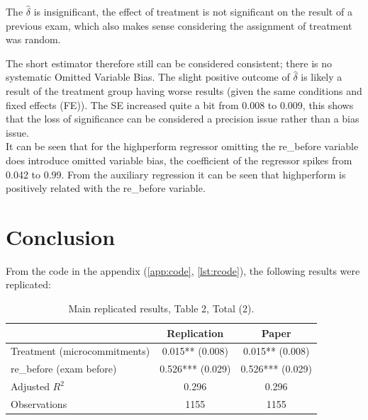 \documentclass[12pt]{article}
\begin{document}
The $\hat{\delta}$ is insignificant, the effect of treatment is not significant on the result of a previous exam, which also makes sense considering the assignment of treatment was random. 

The short estimator therefore still can be considered consistent; there is no systematic Omitted Variable Bias. The slight positive outcome of $\hat{\delta}$ is likely a result of the treatment group having worse results (given the same conditions and fixed effects (FE)). The SE increased quite a bit from 0.008 to 0.009, this shows that the loss of significance can be considered a precision issue rather than a bias issue.  \\
\newline
It can be seen that for the highperform regressor omitting the re_before variable does introduce omitted variable bias, the coefficient of the regressor spikes from 0.042 to 0.99. From the auxiliary regression it can be seen that highperform is positively related with the re_before variable. 

\section{Conclusion}
From the code in the appendix (\cref{app:code}, \cref{lst:rcode}), the following results were replicated:

\begin{table}[H]
\centering
\caption{Main replicated results, Table 2, Total (2).}
\label{tab:conclusion}
\begin{tabular}{lcc}
\toprule
 & Replication & Paper \\
\midrule
Treatment (microcommitments) & 0.015** (0.008) & 0.015** (0.008) \\
re\_before (exam before)     & 0.526*** (0.029) & 0.526*** (0.029) \\
Adjusted $R^2$               & 0.296 & 0.296 \\
Observations                 & 1155 & 1155 \\
\bottomrule
\end{tabular}
\end{table}
\end{document}
